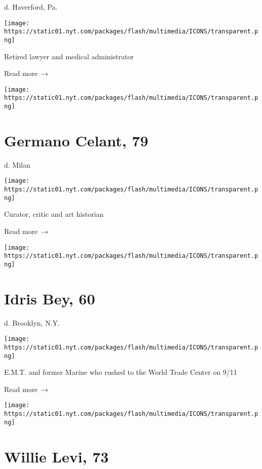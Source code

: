 d. Haverford, Pa.

\texttt{[image: https://static01.nyt.com/packages/flash/multimedia/ICONS/transparent.png]}

Retired lawyer and medical administrator

 Read more~→

\href{https://www.nytimes.com/2020/04/30/arts/germano-celant-curator-behind-italys-arte-povera-dies-at-79.html}{}

\texttt{[image: https://static01.nyt.com/packages/flash/multimedia/ICONS/transparent.png]}

\hypertarget{germano-celant-79}{%
\section{Germano Celant, 79}\label{germano-celant-79}}

d. Milan

\texttt{[image: https://static01.nyt.com/packages/flash/multimedia/ICONS/transparent.png]}

Curator, critic and art historian

 Read more~→

\href{https://www.nytimes.com/2020/04/30/obituaries/idris-bey-dead-coronavirus.html}{}

\texttt{[image: https://static01.nyt.com/packages/flash/multimedia/ICONS/transparent.png]}

\hypertarget{idris-bey-60}{%
\section{Idris Bey, 60}\label{idris-bey-60}}

d. Brooklyn, N.Y.

\texttt{[image: https://static01.nyt.com/packages/flash/multimedia/ICONS/transparent.png]}

E.M.T. and former Marine who rushed to the World Trade Center on 9/11

 Read more~→

\href{https://www.nytimes.com/2020/04/30/us/willie-levi-73-dies-he-escaped-a-life-of-servitude.html}{}

\texttt{[image: https://static01.nyt.com/packages/flash/multimedia/ICONS/transparent.png]}

\hypertarget{willie-levi-73}{%
\section{Willie Levi, 73}\label{willie-levi-73}}

